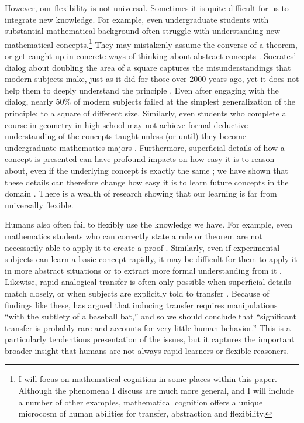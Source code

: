 However, our flexibility is not universal. Sometimes it is quite difficult for us to integrate new knowledge. For example, even undergraduate students with substantial mathematical background often struggle with understanding new mathematical concepts.\footnote{I will focus on mathematical cognition in some places within this paper. Although the phenomena I discuss are much more general, and I will include a number of other examples, mathematical cognition offers a unique microcosm of human abilities for transfer, abstraction and flexibility.} They may mistakenly assume the converse of a theorem, or get caught up in concrete ways of thinking about abstract concepts \citep{Hazzan1999}. Socrates' dialog about doubling the area of a square captures the misunderstandings that modern subjects make, just as it did for those over 2000 years ago, yet it does not help them to deeply understand the principle \citep{Goldin2011}. Even after engaging with the dialog, nearly 50\% of modern subjects failed at the simplest generalization of the principle: to a square of different size. Similarly, even students who complete a course in geometry in high school may not achieve formal deductive understanding of the concepts taught unless (or until) they become undergraduate mathematics majors \citep{Burger1986}. Furthermore, superficial details of how a concept is presented can have profound impacts on how easy it is to reason about, even if the underlying concept is exactly the same \citep[e.g.][]{Kotovsky1985, Kaminski2008}; we have shown that these details can therefore change how easy it is to learn future concepts in the domain \citep{Lampinen2017b}. There is a wealth of research showing that our learning is far from universally flexible. \par 
Humans also often fail to flexibly use the knowledge we have. For example, even mathematics students who can correctly state a rule or theorem are not necessarily able to apply it to create a proof \citep{Weber2001}. Similarly, even if experimental subjects can learn a basic concept rapidly, it may be difficult for them to apply it in more abstract situations or to extract more formal understanding from it \citep[e.g.][]{Lampinen2017b}. Likewise, rapid analogical transfer is often only possible when superficial details match closely, or when subjects are explicitly told to transfer \citep[e.g.][]{Gick1980}. Because of findings like these, \citet{Detterman1993} has argued that inducing transfer requires manipulations ``with the subtlety of a baseball bat,'' and so we should conclude that ``significant transfer is probably rare and accounts for very little human behavior.'' This is a particularly tendentious presentation of the issues, but it captures the important broader insight that humans are not always rapid learners or flexible reasoners. \par 
